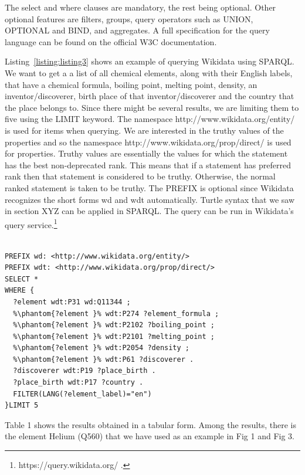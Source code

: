 The select and where clauses are mandatory, the rest being optional. Other optional features are filters, groups, query operators such as UNION, OPTIONAL and BIND, and aggregates. A full specification for the query language can be found on the official W3C documentation\cite{Seaborn}.

Listing~\ref{listing:listing3} shows an example of querying Wikidata using SPARQL. We want to get a a list of all chemical elements, along with their English labels, that have a chemical formula, boiling point, melting point, density, an inventor/discoverer, birth place of that inventor/discoverer and the country that the place belongs to. Since there might be several results, we are limiting them to five using the LIMIT keyword. The namespace http://www.wikidata.org/entity/ is used for items when querying. We are interested in the truthy values of the properties and so the namespace http://www.wikidata.org/prop/direct/ is used for properties. Truthy values are essentially the values for which the statement has the best non-deprecated rank. This means that if a statement has preferred rank then that statement is considered to be truthy. Otherwise, the normal ranked statement is taken to be truthy. The PREFIX is optional since Wikidata recognizes the short forms wd and wdt automatically. Turtle syntax that we saw in section XYZ can be applied in SPARQL. The query can be run in Wikidata's query service.\footnote{https://query.wikidata.org/ .}  

\begin{minipage}{\linewidth}
\begin{lstlisting}[label=listing:listing3, caption={Querying Wikidata with SPARQL}, language=SPARQL]

PREFIX wd: <http://www.wikidata.org/entity/>
PREFIX wdt: <http://www.wikidata.org/prop/direct/>
SELECT *
WHERE {
  ?element wdt:P31 wd:Q11344 ;
  %\phantom{?element }% wdt:P274 ?element_formula ; 
  %\phantom{?element }% wdt:P2102 ?boiling_point ;
  %\phantom{?element }% wdt:P2101 ?melting_point ;
  %\phantom{?element }% wdt:P2054 ?density ;
  %\phantom{?element }% wdt:P61 ?discoverer .
  ?discoverer wdt:P19 ?place_birth .
  ?place_birth wdt:P17 ?country .
  FILTER(LANG(?element_label)="en")
}LIMIT 5

\end{lstlisting}
\end{minipage}

Table 1 shows the results obtained in a tabular form. Among the results, there is the element Helium (Q560) that we have used as an example in Fig 1 and Fig 3. 

